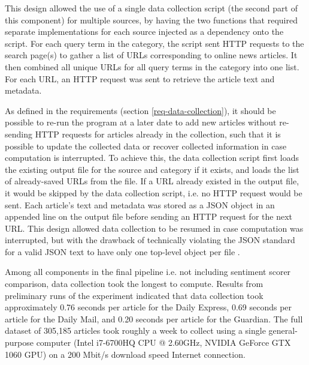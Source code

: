 \documentclass{report}
\begin{document}
This design allowed the use of a single data collection script (the second part of this component) for multiple sources, by having the two functions that required separate implementations for each source injected as a dependency onto the script.
For each query term in the category, the script sent HTTP requests to the search page(s) to gather a list of URLs corresponding to online news articles.
It then combined all unique URLs for all query terms in the category into one list.
For each URL, an HTTP request was sent to retrieve the article text and metadata.

As defined in the requirements (section \ref{req-data-collection}), it should be possible to re-run the program at a later date to add new articles without re-sending HTTP requests for articles already in the collection, such that it is possible to update the collected data or recover collected information in case computation is interrupted.
To achieve this, the data collection script first loads the existing output file for the source and category if it exists, and loads the list of already-saved URLs from the file.
If a URL already existed in the output file, it would be skipped by the data collection script, i.e. no HTTP request would be sent.
Each article's text and metadata was stored as a JSON object in an appended line on the output file before sending an HTTP request for the next URL.
This design allowed data collection to be resumed in case computation was interrupted, but with the drawback of technically violating the JSON standard for a valid JSON text to have only one top-level object per file \cite{rfc8259}.

Among all components in the final pipeline i.e. not including sentiment scorer comparison, data collection took the longest to compute.
Results from preliminary runs of the experiment indicated that data collection took approximately 0.76 seconds per article for the Daily Express, 0.69 seconds per article for the Daily Mail, and 0.20 seconds per article for the Guardian.
The full dataset of 305,185 articles took roughly a week to collect using a single general-purpose computer (Intel i7-6700HQ CPU @ 2.60GHz, NVIDIA GeForce GTX 1060 GPU) on a 200 Mbit/s download speed Internet connection.
\end{document}

